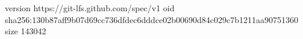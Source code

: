 version https://git-lfs.github.com/spec/v1
oid sha256:130b87aff9b07d69cc736dfdec6dddce02b00690d84c029c7b1211aa90751360
size 143042
